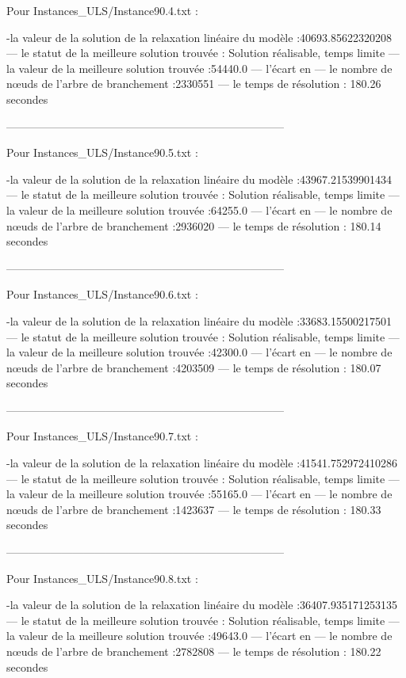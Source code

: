 Pour Instances_ULS/Instance90.4.txt :


-la valeur de la solution de la relaxation linéaire du modèle :40693.85622320208
— le statut de la meilleure solution trouvée : Solution réalisable, temps limite 
— la valeur de la meilleure solution trouvée :54440.0
— l’écart en %
— le nombre de nœuds de l’arbre de branchement :2330551
— le temps de résolution : 180.26 secondes

---------------------------------------------------------------------------

Pour Instances_ULS/Instance90.5.txt :


-la valeur de la solution de la relaxation linéaire du modèle :43967.21539901434
— le statut de la meilleure solution trouvée : Solution réalisable, temps limite 
— la valeur de la meilleure solution trouvée :64255.0
— l’écart en %
— le nombre de nœuds de l’arbre de branchement :2936020
— le temps de résolution : 180.14 secondes

---------------------------------------------------------------------------

Pour Instances_ULS/Instance90.6.txt :


-la valeur de la solution de la relaxation linéaire du modèle :33683.15500217501
— le statut de la meilleure solution trouvée : Solution réalisable, temps limite 
— la valeur de la meilleure solution trouvée :42300.0
— l’écart en %
— le nombre de nœuds de l’arbre de branchement :4203509
— le temps de résolution : 180.07 secondes

---------------------------------------------------------------------------

Pour Instances_ULS/Instance90.7.txt :


-la valeur de la solution de la relaxation linéaire du modèle :41541.752972410286
— le statut de la meilleure solution trouvée : Solution réalisable, temps limite 
— la valeur de la meilleure solution trouvée :55165.0
— l’écart en %
— le nombre de nœuds de l’arbre de branchement :1423637
— le temps de résolution : 180.33 secondes

---------------------------------------------------------------------------

Pour Instances_ULS/Instance90.8.txt :


-la valeur de la solution de la relaxation linéaire du modèle :36407.935171253135
— le statut de la meilleure solution trouvée : Solution réalisable, temps limite 
— la valeur de la meilleure solution trouvée :49643.0
— l’écart en %
— le nombre de nœuds de l’arbre de branchement :2782808
— le temps de résolution : 180.22 secondes



